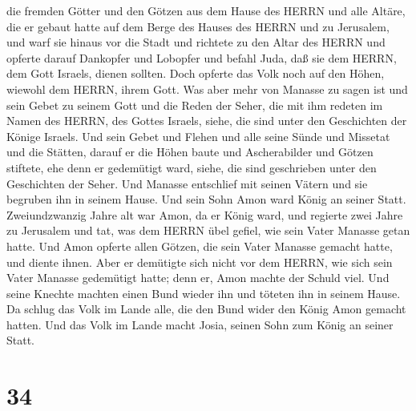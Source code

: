 die fremden Götter und den Götzen aus dem Hause des HERRN und alle
Altäre, die er gebaut hatte auf dem Berge des Hauses des HERRN und zu
Jerusalem, und warf sie hinaus vor die Stadt  und richtete
zu den Altar des HERRN und opferte darauf Dankopfer und Lobopfer und
befahl Juda, daß sie dem HERRN, dem Gott Israels, dienen sollten.
 Doch opferte das Volk noch auf den Höhen, wiewohl dem
HERRN, ihrem Gott.  Was aber mehr von Manasse zu sagen ist
und sein Gebet zu seinem Gott und die Reden der Seher, die mit ihm
redeten im Namen des HERRN, des Gottes Israels, siehe, die sind unter
den Geschichten der Könige Israels.  Und sein Gebet und
Flehen und alle seine Sünde und Missetat und die Stätten, darauf er die
Höhen baute und Ascherabilder und Götzen stiftete, ehe denn er
gedemütigt ward, siehe, die sind geschrieben unter den Geschichten der
Seher.  Und Manasse entschlief mit seinen Vätern und sie
begruben ihn in seinem Hause. Und sein Sohn Amon ward König an seiner
Statt.  Zweiundzwanzig Jahre alt war Amon, da er König
ward, und regierte zwei Jahre zu Jerusalem  und tat, was
dem HERRN übel gefiel, wie sein Vater Manasse getan hatte. Und Amon
opferte allen Götzen, die sein Vater Manasse gemacht hatte, und diente
ihnen.  Aber er demütigte sich nicht vor dem HERRN, wie
sich sein Vater Manasse gedemütigt hatte; denn er, Amon machte der
Schuld viel.  Und seine Knechte machten einen Bund wieder
ihn und töteten ihn in seinem Hause.  Da schlug das Volk im
Lande alle, die den Bund wider den König Amon gemacht hatten. Und das
Volk im Lande macht Josia, seinen Sohn zum König an seiner Statt.

\hypertarget{section-33}{%
\section{34}\label{section-33}}

